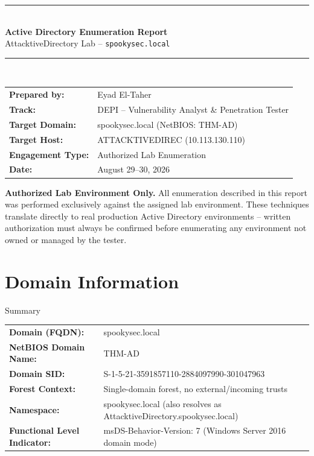 \documentclass[11pt]{article}
\begin{document}
\begin{titlepage}
\centering
\vspace*{1.5cm}
{\color{teal}\rule{\linewidth}{2pt}}\\[0.6cm]
{\huge\bfseries\color{navy} Active Directory Enumeration Report}\\[0.4cm]
{\Large\color{graytext} AttacktiveDirectory Lab -- \texttt{spookysec.local}}\\[0.8cm]
{\color{teal}\rule{\linewidth}{2pt}}\\[1.5cm]

\begin{tabular}{ll}
\textbf{Prepared by:} & Eyad El-Taher \\
\textbf{Track:} & DEPI -- Vulnerability Analyst \& Penetration Tester \\
\textbf{Target Domain:} & spookysec.local (NetBIOS: THM-AD) \\
\textbf{Target Host:} & ATTACKTIVEDIREC (10.113.130.110) \\
\textbf{Engagement Type:} & Authorized Lab Enumeration \\
\textbf{Date:} & August 29--30, 2026 \\
\end{tabular}

\vfill

\begin{warnbox}
\textbf{Authorized Lab Environment Only.} All enumeration described in this
report was performed exclusively against the assigned lab environment. These
techniques translate directly to real production Active Directory environments --
written authorization must always be confirmed before enumerating any environment
not owned or managed by the tester.
\end{warnbox}

\end{titlepage}

\tableofcontents
\newpage

\section{Domain Information}
\begin{sectionbox}{Summary}
\begin{tabular}{@{}ll}
\textbf{Domain (FQDN):} & spookysec.local \\
\textbf{NetBIOS Domain Name:} & THM-AD \\
\textbf{Domain SID:} & S-1-5-21-3591857110-2884097990-301047963 \\
\textbf{Forest Context:} & Single-domain forest, no external/incoming trusts \\
\textbf{Namespace:} & spookysec.local (also resolves as AttacktiveDirectory.spookysec.local) \\
\textbf{Functional Level Indicator:} & msDS-Behavior-Version: 7 (Windows Server 2016 domain mode) \\
\end{tabular}
\end{sectionbox}
\end{document}
